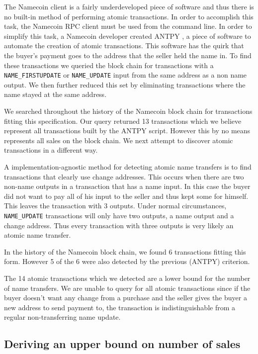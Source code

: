 The Namecoin client is a fairly underdeveloped piece of software and thus there is no built-in method of performing atomic transactions. In order to accomplish this task, the Namecoin RPC client must be used from the command line. In order to simplify this task, a Namecoin developer created ANTPY \cite{antpy}, a piece of software to automate the creation of atomic transactions. This software has the quirk that the buyer's payment goes to the address that the seller held the name in. To find these transactions we queried the block chain for transactions with a {\tt NAME\_FIRSTUPDATE} or {\tt NAME\_UPDATE} input from the same address as a non name output. We then further reduced this set by eliminating transactions where the name stayed at the same address.

We searched throughout the history of the Namecoin block chain for transactions fitting this specification. Our query returned 13 transactions which we believe represent all transactions built by the ANTPY script. However this by no means represents all sales on the block chain. We next attempt to discover atomic transactions in a different way.

A implementation-agnostic method for detecting atomic name transfers is to find transactions that clearly use change addresses. This occurs when there are two non-name outputs in a transaction that has a name input. In this case the buyer did not want to pay all of his input to the seller and thus kept some for himself. This leaves the transaction with 3 outputs. Under normal circumstances, {\tt NAME\_UPDATE} transactions will only have two outputs, a name output and a change address. Thus every transaction with three outputs is very likely an atomic name transfer.

In the history of the Namecoin block chain, we found 6 transactions fitting this form. However 5 of the 6 were also detected by the previous (ANTPY) criterion.

The 14 atomic transactions which we detected are a lower bound for the number of name transfers. We are unable to query for all atomic transactions since if the buyer doesn't want any change from a purchase and the seller gives the buyer a new address to send payment to, the transaction is indistinguishable from a regular non-transferring name update.

\subsection{Deriving an upper bound on number of sales}

